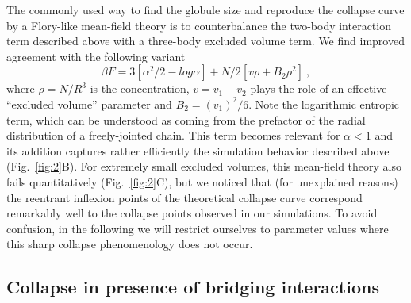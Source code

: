 \documentclass[
preprint,
a4paper,
12pt,
superscriptaddress,
pre]{revtex4}
\begin{document}
% 
The commonly used way to find the globule size and reproduce the
collapse curve by a Flory-like mean-field theory is to counterbalance
the two-body interaction term described above with a three-body
excluded volume term. We find improved agreement with the following
variant~\cite{DeGennes1975}
  \begin{equation}
    \beta F = 3 [\alpha^2/2 - log \alpha] + N/2 [v \rho  + B_2 \rho^2 ] \ ,
    \label{eq:deg_mfield}
\end{equation}
where $\rho = N/R^3$ is the concentration, $v = v_1 - v_2$ plays the
role of an effective ``excluded volume'' parameter and $B_2 = (v_1)^2
/ 6$. Note the logarithmic entropic term, which can be understood as
coming from the prefactor of the radial distribution of a
freely-jointed chain.
%
%
This term becomes relevant for $\alpha < 1$ and its addition captures
rather efficiently the simulation behavior described above
(Fig.~\ref{fig:2}B).  For extremely small excluded volumes, this
mean-field theory also fails quantitatively (Fig.~\ref{fig:2}C), but
we noticed that (for unexplained reasons) the reentrant inflexion
points of the theoretical collapse curve correspond remarkably well to
the collapse points observed in our simulations. To avoid confusion,
in the following we will restrict ourselves to parameter values where
this sharp collapse phenomenology does not occur.



\subsection*{Collapse in presence of bridging interactions}
\end{document}
